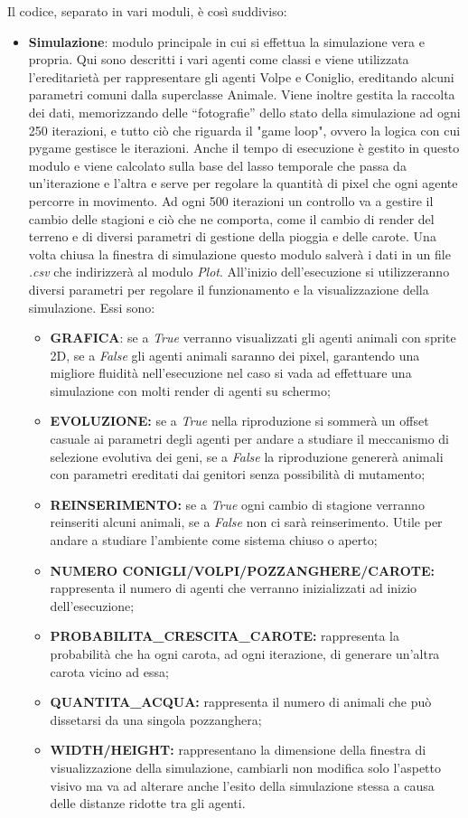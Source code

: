 \documentclass[11pt]{article}
\begin{document}
Il codice, separato in vari moduli, è così suddiviso: \begin{itemize}
    \item \textbf{Simulazione}: modulo principale in cui si effettua la simulazione vera e propria. Qui sono descritti i vari agenti come classi e viene utilizzata l'ereditarietà per rappresentare gli agenti Volpe e Coniglio, ereditando alcuni parametri comuni dalla superclasse Animale. Viene inoltre gestita la raccolta dei dati, memorizzando delle “fotografie” dello stato della simulazione ad ogni 250 iterazioni, e tutto ciò che riguarda il "game loop", ovvero la logica con cui pygame gestisce le iterazioni. Anche il tempo di esecuzione è gestito in questo modulo e viene calcolato sulla base del lasso temporale che passa da un'iterazione e l'altra e serve per regolare la quantità di pixel che ogni agente percorre in movimento. Ad ogni 500 iterazioni un controllo va a gestire il cambio delle stagioni e ciò che ne comporta, come il cambio di render del terreno e di diversi parametri di gestione della pioggia e delle carote. Una volta chiusa la finestra di simulazione questo modulo salverà i dati in un file \textit{.csv} che indirizzerà al modulo \textit{Plot}. All'inizio dell'esecuzione si utilizzeranno diversi parametri per regolare il funzionamento e la visualizzazione della simulazione. Essi sono:
    \begin{itemize}
        \item \textbf{GRAFICA}: se a \textit{True} verranno visualizzati gli agenti animali con sprite 2D, se a \textit{False} gli agenti animali saranno dei pixel, garantendo una migliore fluidità nell'esecuzione nel caso si vada ad effettuare una simulazione con molti render di agenti su schermo;
        \item \textbf{EVOLUZIONE:} se a \textit{True} nella riproduzione si sommerà un offset casuale ai parametri degli agenti per andare a studiare il meccanismo di selezione evolutiva dei geni, se a \textit{False} la riproduzione genererà animali con parametri ereditati dai genitori senza possibilità di mutamento;
        \item \textbf{REINSERIMENTO:} se a \textit{True} ogni cambio di stagione verranno reinseriti alcuni animali, se a \textit{False} non ci sarà reinserimento. Utile per andare a studiare l'ambiente come sistema chiuso o aperto;
        \item \textbf{NUMERO CONIGLI/VOLPI/POZZANGHERE/CAROTE:}  rappresenta il numero di agenti che verranno inizializzati ad inizio dell’esecuzione;
        \item \textbf{PROBABILITA\_CRESCITA\_CAROTE:}  rappresenta la probabilità che ha ogni carota, ad ogni iterazione, di generare un’altra carota vicino ad essa;
        \item \textbf{QUANTITA\_ACQUA:}  rappresenta il numero di animali che può dissetarsi da una singola pozzanghera;
        \item \textbf{WIDTH/HEIGHT:}  rappresentano la dimensione della finestra di visualizzazione della simulazione, cambiarli non modifica solo l’aspetto visivo ma va ad alterare anche l’esito della simulazione stessa a causa delle distanze ridotte tra gli agenti.


\end{itemize}
\end{itemize}
\end{document}
